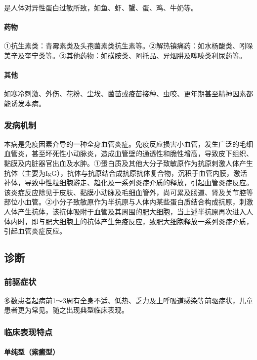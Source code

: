 是人体对异性蛋白过敏所致，如鱼、虾、蟹、蛋、鸡、牛奶等。

\paragraph{药物}

①抗生素类：青霉素类及头孢菌素类抗生素等。②解热镇痛药：如水杨酸类、吲哚美辛及奎宁类等。③其他药物：如磺胺类、阿托品、异烟肼及噻嗪类利尿药等。

\paragraph{其他}

如寒冷刺激、外伤、花粉、尘埃、菌苗或疫苗接种、虫咬、更年期甚至精神因素都能诱发本病。

\subsubsection{发病机制}

本病是免疫因素介导的一种全身血管炎症。免疫反应损害小血管，发生广泛的毛细血管炎，甚至坏死性小动脉炎，造成血管壁的通透性和脆性增高，导致皮下组织、黏膜及内脏器官出血及水肿。①蛋白质及其他大分子致敏原作为抗原刺激人体产生抗体（主要为IgG），抗体与抗原结合成抗原抗体复合物，沉积于血管内膜，激活补体，导致中性粒细胞游走、趋化及一系列炎症介质的释放，引起血管炎症反应。该炎症反应除见于皮肤、黏膜小动脉及毛细血管外，尚可累及肠道、肾及关节腔等部位小血管。②小分子致敏原作为半抗原与人体内某些蛋白质结合构成抗原，刺激人体产生抗体，该抗体吸附于血管及其周围的肥大细胞，当上述半抗原再次进入人体内时，即与肥大细胞上的抗体产生免疫反应，致肥大细胞释放一系列炎症介质，引起血管炎症反应。

\subsection{诊断}

\subsubsection{前驱症状}

多数患者起病前1～3周有全身不适、低热、乏力及上呼吸道感染等前驱症状，儿童患者更为常见。随之出现典型临床表现。

\subsubsection{临床表现特点}

\paragraph{单纯型（紫癜型）}

